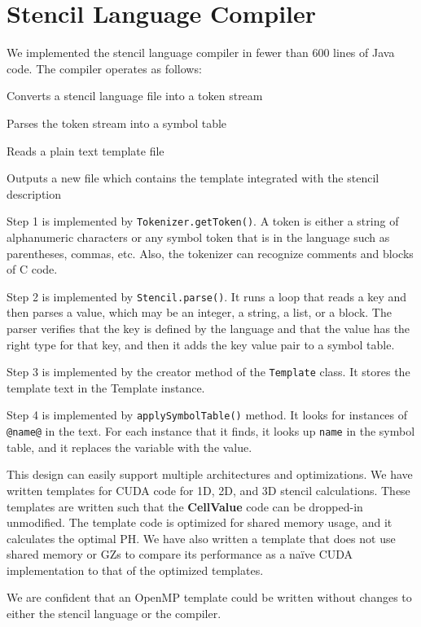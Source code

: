 \documentclass[preprint,nocopyrightspace]{styles/sigplanconf}
\begin{document}
\section{Stencil Language Compiler}

We implemented the stencil language compiler in fewer than 600 lines of
Java code.  The compiler operates as follows:
\begin{enumerate*}
\item Converts a stencil language file into a token stream
\item Parses the token stream into a symbol table
\item Reads a plain text template file
\item Outputs a new file which contains the template integrated with
  the stencil description
\end{enumerate*}

Step 1 is implemented by {\tt Tokenizer.getToken()}.  A token is
either a string of alphanumeric characters or any symbol token that is
in the language such as parentheses, commas, etc.  Also, the tokenizer
can recognize comments and blocks of C code.

Step 2 is implemented by {\tt Stencil.parse()}.  It runs a loop that
reads a key and then parses a value, which may be an integer, a
string, a list, or a block.  The parser verifies that the key is
defined by the language and that the value has the right type for that
key, and then it adds the key value pair to a symbol table.

Step 3 is implemented by the creator method of the {\tt Template}
class.  It stores the template text in the Template instance.

Step 4 is implemented by {\tt applySymbolTable()} method.  It looks
for instances of {\tt @name@} in the text.  For each instance that it
finds, it looks up {\tt name} in the symbol table, and it replaces the
variable with the value.

This design can easily support multiple architectures
and optimizations.  We have written templates for CUDA code for 1D,
2D, and 3D stencil calculations.  These templates are written such
that the {\bf CellValue} code can be dropped-in unmodified.  The 
template code is optimized for shared memory usage, and it
calculates the optimal PH.  
We have also written a template that does not use 
shared memory or GZs to compare
its performance as a na\"{i}ve CUDA implementation
to that of the optimized templates.

We are confident that an OpenMP template could be written without
changes to either the stencil language or the compiler.
\end{document}
